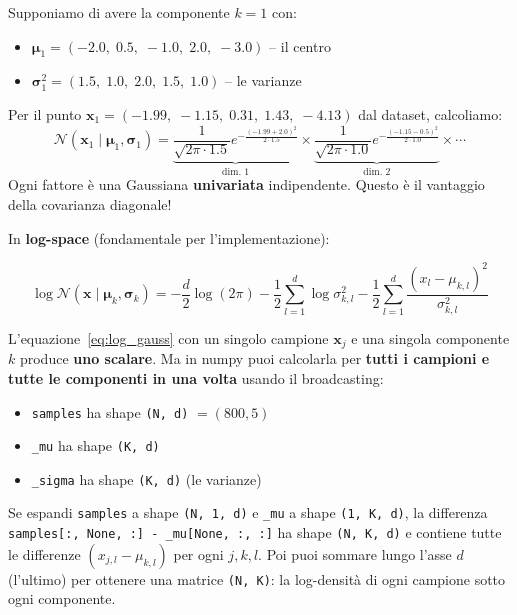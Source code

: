 \documentclass[11pt,a4paper]{article}
\begin{document}
\begin{exbox}[Esempio concreto con il nostro dataset ($d=5$)]
Supponiamo di avere la componente $k=1$ con:
\begin{itemize}
    \item $\boldsymbol{\mu}_1 = (-2.0,\; 0.5,\; -1.0,\; 2.0,\; -3.0)$ -- il centro
    \item $\boldsymbol{\sigma}_1^2 = (1.5,\; 1.0,\; 2.0,\; 1.5,\; 1.0)$ -- le varianze
\end{itemize}
Per il punto $\mathbf{x}_1 = (-1.99,\; -1.15,\; 0.31,\; 1.43,\; -4.13)$ dal dataset, calcoliamo:
$$\mathcal{N}(\mathbf{x}_1\mid\boldsymbol{\mu}_1, \boldsymbol{\sigma}_1) = \underbrace{\frac{1}{\sqrt{2\pi \cdot 1.5}}e^{-\frac{(-1.99+2.0)^2}{2 \cdot 1.5}}}_{\text{dim.\ 1}} \times \underbrace{\frac{1}{\sqrt{2\pi \cdot 1.0}}e^{-\frac{(-1.15-0.5)^2}{2 \cdot 1.0}}}_{\text{dim.\ 2}} \times \cdots$$
Ogni fattore \`e una Gaussiana \textbf{univariata} indipendente. Questo \`e il vantaggio della covarianza diagonale!
\end{exbox}

In \textbf{log-space} (fondamentale per l'implementazione):

\begin{equation}
    \boxed{\log \mathcal{N}(\mathbf{x}\mid\boldsymbol{\mu}_k, \boldsymbol{\sigma}_k) = -\frac{d}{2}\log(2\pi) - \frac{1}{2}\sum_{l=1}^{d}\log\sigma_{k,l}^2 - \frac{1}{2}\sum_{l=1}^{d}\frac{(x_l - \mu_{k,l})^2}{\sigma_{k,l}^2}}
    \label{eq:log_gauss}
\end{equation}

\begin{tipbox}
L'equazione~\eqref{eq:log_gauss} con un singolo campione $\mathbf{x}_j$ e una singola componente $k$ produce \textbf{uno scalare}. Ma in numpy puoi calcolarla per \textbf{tutti i campioni e tutte le componenti in una volta} usando il broadcasting:
\begin{itemize}
    \item \texttt{samples} ha shape \texttt{(N, d)} $= (800, 5)$
    \item \texttt{\_mu} ha shape \texttt{(K, d)}
    \item \texttt{\_sigma} ha shape \texttt{(K, d)} (le varianze)
\end{itemize}
Se espandi \texttt{samples} a shape \texttt{(N, 1, d)} e \texttt{\_mu} a shape \texttt{(1, K, d)}, la differenza \texttt{samples[:, None, :] - \_mu[None, :, :]} ha shape \texttt{(N, K, d)} e contiene tutte le differenze $(x_{j,l} - \mu_{k,l})$ per ogni $j, k, l$. Poi puoi sommare lungo l'asse $d$ (l'ultimo) per ottenere una matrice \texttt{(N, K)}: la log-densit\`a di ogni campione sotto ogni componente.
\end{tipbox}
\end{document}
